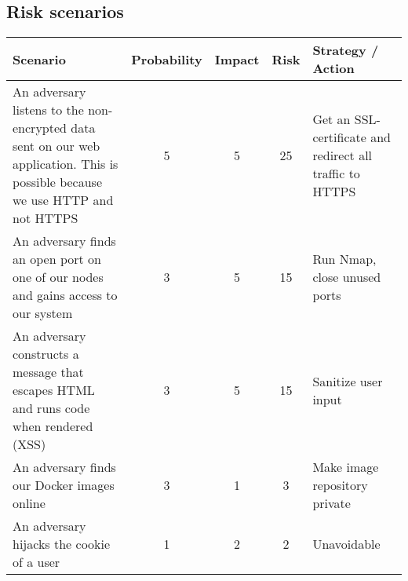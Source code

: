 \subsection{Risk scenarios}

\begin{center}
\begin{tabular}{ |p{3.5cm}|c|c|c|p{2.5cm}| } 
 \hline
 Scenario & Probability & Impact & Risk & Strategy / Action\\ [0.5ex] 
 \hline
 An adversary listens to the non-encrypted data sent on our web application. This is possible because we use HTTP and not HTTPS
 & 5 & 5 & 25 & Get an SSL-certificate and redirect all traffic to HTTPS\\
\hline
 An adversary finds an open port on one of our nodes and gains access to our system & 3 & 5 & 15 & Run Nmap, close unused ports\\
 \hline 
 An adversary constructs a message that escapes HTML and runs code when rendered (XSS) & 3 & 5 & 15 & Sanitize user input\\
 \hline
  An adversary finds our Docker images online & 3 & 1 & 3 & Make image repository private\\ 
 \hline
 An adversary hijacks the cookie of a user & 1 & 2 & 2 & Unavoidable\\ 
 \hline
\end{tabular}
\end{center}

